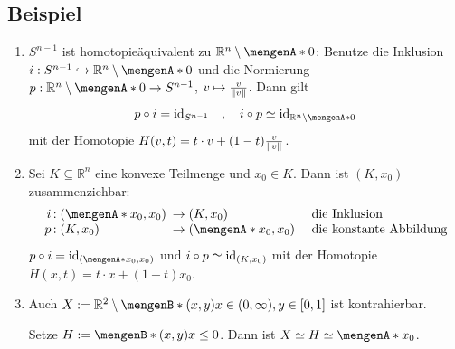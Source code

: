 \subsection[Beispiele für Homotopieäquivalenzen und zusammenziehbare Räume]{Beispiel} %
\label{sub:11.6}
\begin{enumerate}[(1)]
	\item $S^{n-1}$ ist homotopieäquivalent zu $\mathds{R}^n \setminus \set{0}$: Benutze die Inklusion $i : S^{n-1} \hookrightarrow \mathds{R}^n \setminus \set{0}$ und
	die Normierung $p : \mathds{R}^n \setminus \set{0}  \to S^{n-1}$, $v \mapsto \frac{v}{\norm{v}}$. Dann gilt
	\[
		p \circ i = \id_{S^{n-1}} \quad , \quad i \circ p  \simeq \id_{\mathds{R}^{n} \setminus \set{0} }
	\]
	mit der Homotopie $H(v,t)= t \cdot v + (1-t) \frac{v}{\norm{v} } $.
	\item Sei $K \subseteq \mathds{R}^n$ eine konvexe Teilmenge und $x_0 \in K$. Dann ist $(K,x_0)$ zusammenziehbar:
	\[
		\begin{array}{r@{\,}l@{}ll}
			i &: \enbrace*{\set{x_0}, x_0 }\enspace &\to  (K,x_0) \qquad  &\text{ die Inklusion}\\
			p &: \enbrace*{K, x_0} &\to  \enbrace*{\set{x_0}, x_0 }  &\text{ die konstante Abbildung}
		\end{array}
	\]
	$p \circ i = \id_{\enbrace*{\set{x_0}, x_0 } }$ und $i \circ p \simeq \operatorname{id}_{(K,x_0)}$ mit der Homotopie $H(x,t)= t \cdot x + (1-t)x_0$.
	\item Auch $X := \mathds{R}^2 \setminus \set[(x,y)]{x \in (0,\infty) , y \in [0,1]} $ ist kontrahierbar.
	\begin{figure}[H]
	\end{figure}
	Setze $H := \set[(x,y)]{x \le 0} $. Dann ist $X \simeq H \simeq \set{x_0}$.
\end{enumerate}

